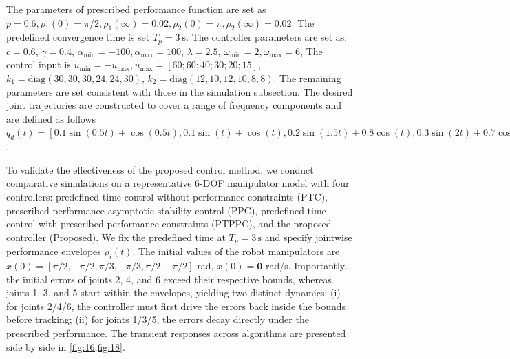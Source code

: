 \documentclass[pdflatex,sn-mathphys-num]{sn-jnl}%
\theoremstyle{thmstyleone}%
\theoremstyle{thmstyletwo}%
\theoremstyle{thmstylethree}%
\begin{document}
The parameters of prescribed performance function are set as $p=0.6, \rho_1(0)=\pi/2, \rho_1(\infty )=0.02,\rho_2(0)=\pi, \rho_2(\infty )=0.02$. The predefined convergence time is set $T_p = 3\ \mathrm{s}$.
The controller parameters are set as: $c=0.6$, $\gamma=0.4$, $\alpha_{\min}=-100, \alpha_{\max}=100$, $\lambda=2.5$, $\omega_{\min}=2, \omega_{\max}=6$, The control input is $u_{\min}=-u_{\max}, u_{\max}=[60; 60; 40; 30; 20; 15]$, $k_1=\mathrm{diag}( 30, 30, 30, 24, 24, 30) $, $k_2=\mathrm{diag}(12, 10, 12, 10, 8, 8)$. The remaining parameters are set consistent with those in the simulation subsection.
The desired joint trajectories are constructed to cover a range of frequency components and are defined as follows
$q_d(t)=[
			0.1\sin(0.5t) + \cos(0.5t),    
			0.1\sin(t) + \cos(t),          
			0.2\sin(1.5t) + 0.8\cos(t) ,   
			0.3\sin(2t) + 0.7\cos(0.5t),  
			0.1\sin(0.3t) + 0.9\cos(0.2t),
			0.4\sin(t) + 0.6\cos(2t)    
		]
$.


To validate the effectiveness of the proposed control method, we conduct comparative simulations on a representative 6-DOF manipulator model with four controllers: predefined-time control without performance constraints (PTC), prescribed-performance asymptotic stability control (PPC), predefined-time control with prescribed-performance constraints (PTPPC), and the proposed controller (Proposed). We fix the predefined time at $T_p=3\,\mathrm{s}$ and specify jointwise performance envelopes $\rho_i(t)$. The initial values of the robot manipulators are ${x}(0)=[{\pi}/{2}, -{\pi}/{2},{\pi}/{3}, -{\pi}/{3},{\pi}/{2},-{\pi}/{2}]$ rad, $\dot{x}(0)=\mathbf{0}$ rad/s. Importantly, the initial errors of joints 2, 4, and 6 exceed their respective bounds, whereas joints 1, 3, and 5 start within the envelopes, yielding two distinct dynamics: (i) for joints 2/4/6, the controller must first drive the errors back inside the bounds before tracking; (ii) for joints 1/3/5, the errors decay directly under the prescribed performance. The transient responses across algorithms are presented side by side in \cref{fig:16,fig:18}.
\end{document}
